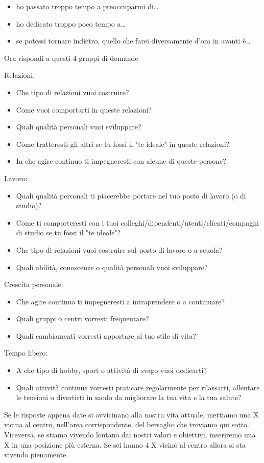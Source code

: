 \documentclass[12pt]{book} %
\begin{document}
\begin{itemize}
\item ho passato troppo tempo a preoccuparmi di… 
\item ho dedicato troppo poco tempo a… 
\item se potessi tornare indietro, quello che farei diversamente d'ora in avanti è…
\end{itemize}

\bigskip

Ora rispondi a questi 4 gruppi di domande

Relazioni:

\begin{itemize}
\item Che tipo di relazioni vuoi costruire? 
\item Come vuoi comportarti in queste relazioni? 
\item Quali qualità personali vuoi sviluppare? 
\item Come tratteresti gli altri se tu fossi il "te ideale" in queste
relazioni? 
\item In che agire continuo ti impegneresti con alcune di queste persone?
\end{itemize}
Lavoro:

\begin{itemize}
\item Quali qualità personali ti piacerebbe portare nel tuo posto di lavoro (o di studio)? 
\item Come ti comporteresti con i tuoi colleghi/dipendenti/utenti/clienti/compagni di studio se tu fossi il
"te ideale"? 
\item Che tipo di relazioni vuoi costruire sul posto di lavoro o a scuola? 
\item Quali abilità, conoscenze o qualità personali vuoi sviluppare?
\end{itemize}
Crescita personale:

\begin{itemize}
\item Che agire continuo ti impegneresti a intraprendere o a continuare? 
\item Quali gruppi o centri vorresti frequentare? 
\item Quali cambiamenti vorresti apportare al tuo stile di vita?
\end{itemize}
Tempo libero: 

\begin{itemize}
\item A che tipo di hobby, sport o attività di svago vuoi dedicarti? 
\item Quali attività continue vorresti praticare regolarmente per rilassarti, allentare le tensioni o divertirti in modo
da migliorare la tua vita e la tua salute?
\end{itemize}
Se le risposte appena date si avvicinano alla nostra vita attuale, mettiamo una X vicina al centro,
nell'area corrispondente, del bersaglio che troviamo qui sotto. Viceversa, se stiamo vivendo
lontano dai nostri valori e obiettivi, inseriremo una X in una posizione più esterna. Se sei hanno 4 X vicino al centro
allora si sta vivendo pienamente.
\end{document}
